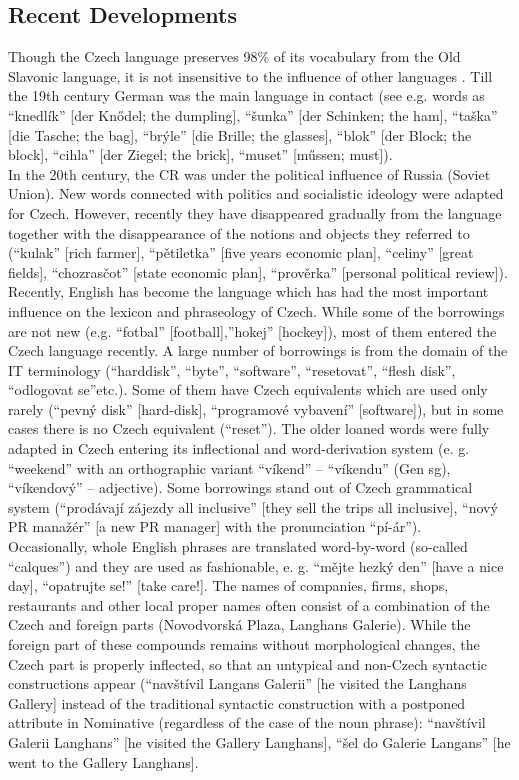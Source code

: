 \begin{multicols}{2}
\subsection{Recent Developments}

Though the Czech language preserves 98\% of its vocabulary from the Old Slavonic language, it is not insensitive to the influence of other languages \cite{Note5}. Till the 19th century German was the main language in contact (see e.g. words as “knedlík” {[}der Knődel; the dumpling{]}, “šunka” {[}der Schinken; the ham{]}, “taška” {[}die Tasche; the bag{]}, “brýle” {[}die Brille; the glasses{]}, “blok” {[}der Block; the block{]}, “cihla” {[}der Ziegel; the brick{]}, “muset” {[}műssen; must{]}).\\
In the 20th century, the CR was under the political influence of Russia (Soviet Union). New words connected with politics and socialistic ideology were adapted for Czech. However, recently they have disappeared gradually from the language together with the disappearance of the notions and objects they referred to (“kulak” {[}rich farmer{]}, “pětiletka” {[}five years economic plan{]}, “celiny” {[}great fields{]}, “chozrasčot” {[}state economic plan{]},  “prověrka” {[}personal political review{]}).
Recently, English has become the language which has had the most important influence on the lexicon and phraseology of Czech. While some of the borrowings are not new (e.g. “fotbal” {[}football{]},”hokej” {[}hockey{]}), most of them entered the Czech language recently. A large number of borrowings is from the domain of the IT terminology (“harddisk”, “byte”, “software”, “resetovat”, “flesh disk”, “odlogovat se”etc.). Some of them have Czech equivalents which are used only rarely (“pevný disk” {[}hard-disk{]}, “programové vybavení” {[}software{]}), but in some cases there is no Czech equivalent (“reset”).
The older loaned words were fully adapted in Czech entering its inflectional and word-derivation system (e. g. “weekend” with an orthographic variant “víkend” – “víkendu” (Gen sg), “víkendový” – adjective). Some borrowings stand out of Czech grammatical system (“prodávají zájezdy all inclusive” {[}they sell the trips all inclusive{]}, “nový PR manažér” {[}a new PR manager{]} with the pronunciation “pí-ár”).\\
Occasionally, whole English phrases are translated word-by-word (so-called “calques”) and they are used as fashionable, e. g. “mějte hezký den” {[}have a nice day{]}, “opatrujte se!” {[}take care!{]}. The names of companies, firms, shops, restaurants and other local proper names often consist of a combination of the Czech and foreign parts (Novodvorská Plaza, Langhans Galerie). While the foreign part of these compounds remains without morphological changes, the Czech part is properly inflected, so that an untypical and non-Czech syntactic constructions appear (“navštívil Langans Galerii” {[}he visited the Langhans Gallery{]} instead of the traditional syntactic construction with a postponed attribute in Nominative (regardless of the case of the noun phrase): “navštívil Galerii Langhans” {[}he visited the Gallery Langhans{]}, “šel do Galerie Langans” {[}he went to the Gallery Langhans{]}.\\

\end{multicols}
